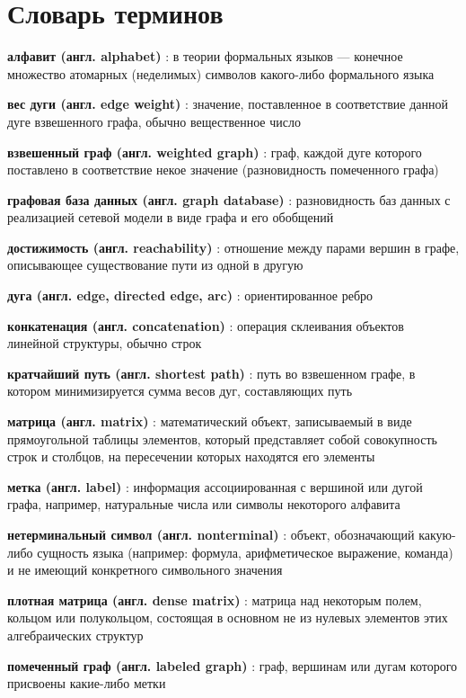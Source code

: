 \chapter*{Словарь терминов}             %

\textbf{алфавит (англ. alphabet)} : в теории формальных языков --- конечное множество атомарных (неделимых) символов какого-либо формального языка

\textbf{вес дуги (англ. edge weight)} : значение, поставленное в соответствие данной дуге взвешенного графа, обычно вещественное число

\textbf{взвешенный граф (англ. weighted graph)} : граф, каждой дуге которого поставлено в соответствие некое значение (разновидность помеченного графа)

\textbf{графовая база данных (англ. graph database)} : разновидность баз данных с реализацией сетевой модели в виде графа и его обобщений

\textbf{достижимость (англ. reachability)} : отношение между парами вершин в графе, описывающее существование пути из одной в другую

\textbf{дуга (англ. edge, directed edge, arc)} : ориентированное ребро

\textbf{конкатенация (англ. concatenation)} : операция склеивания объектов линейной структуры, обычно строк

\textbf{кратчайший путь (англ. shortest path)} : путь во взвешенном графе, в котором минимизируется сумма весов дуг, составляющих путь

\textbf{матрица (англ. matrix)} :  математический объект, записываемый в виде прямоугольной таблицы элементов, который представляет собой совокупность строк и столбцов, на пересечении которых находятся его элементы

\textbf{метка (англ. label)} : информация ассоциированная с вершиной или дугой графа, например, натуральные числа или символы некоторого алфавита

\textbf{нетерминальный символ (англ. nonterminal)} : объект, обозначающий какую-либо сущность языка (например: формула, арифметическое выражение, команда) и не имеющий конкретного символьного значения

\textbf{плотная матрица (англ. dense matrix)} : матрица над некоторым полем, кольцом или полукольцом, состоящая в основном не из нулевых элементов этих алгебраических структур

\textbf{помеченный граф (англ. labeled graph)} : граф, вершинам или дугам которого присвоены какие-либо метки

